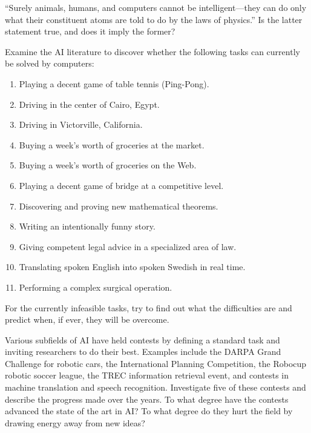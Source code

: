 \begin{exercise}
``Surely animals, humans, and computers cannot be intelligent---they 
can do only what their constituent atoms are told to do by the laws 
of physics.''  Is the latter statement 
true, and does it imply the former?
\end{exercise} 



\begin{exercise}\libex
Examine the AI literature to discover whether  the following
tasks can currently be solved by computers:
\begin{enumerate}
\item Playing a decent game of table tennis (Ping-Pong).
\item Driving in the center of Cairo, Egypt.
\item Driving in Victorville, California.
\item Buying a week's worth of groceries at the market.
\item Buying a week's worth of groceries on the Web.
\item Playing a decent game of bridge at a competitive level.
\item Discovering and proving new mathematical theorems.
\item Writing an intentionally funny story.
\item Giving competent legal advice in a specialized area of law.
\item Translating spoken English into spoken Swedish in real time.
\item Performing a complex surgical operation.
\end{enumerate}
For the currently infeasible tasks, try to find out what the
difficulties are and predict  when, if ever, they will be overcome.
\end{exercise} 

\begin{exercise}
Various subfields of AI have held contests by defining a standard task
and inviting researchers to do their best.  Examples include the DARPA
Grand Challenge for robotic cars, the International Planning
Competition, the Robocup robotic soccer league, the TREC information
retrieval event, and contests in machine translation and speech
recognition. Investigate five of these contests and describe the
progress made over the years. To what degree have the contests
advanced the state of the art in AI?  To what degree do they hurt the field
by drawing energy away from new ideas?
\end{exercise} 




